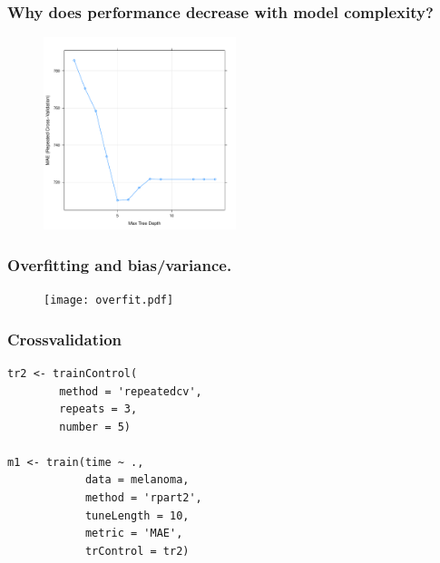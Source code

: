 \documentclass[handout, aspectratio = 169]{beamer}
\begin{document}
\begin{frame}
\frametitle{Why does performance decrease  with model complexity?}
\vspace{-4mm}
\begin{figure}
    \includegraphics[width = 0.5\textwidth]{rpart_perf.pdf}
\end{figure} 

\end{frame} 


\begin{frame}
\frametitle{Overfitting and bias/variance.}
\vspace{-4mm}
\begin{figure}
    \texttt{[image: overfit.pdf]}
\end{figure} 

\end{frame} 





\begin{frame}[fragile]
\frametitle{Crossvalidation}
\begin{Verbatim}
tr2 <- trainControl(
        method = 'repeatedcv',
        repeats = 3,
        number = 5)

m1 <- train(time ~ ., 
            data = melanoma,
            method = 'rpart2',
            tuneLength = 10,
            metric = 'MAE',
            trControl = tr2)

\end{Verbatim}

\end{frame} 
\end{document}
